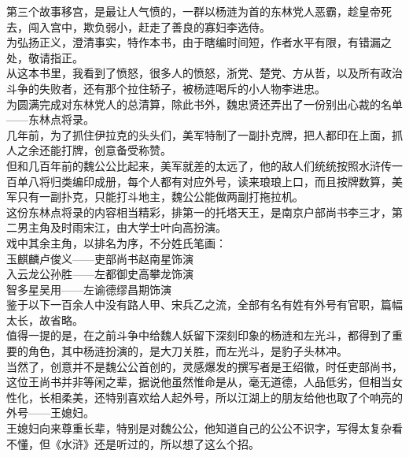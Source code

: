 \begin{multicols}{\theparacolNo}
第三个故事移宫，是最让人气愤的，一群以杨涟为首的东林党人恶霸，趁皇帝死去，闯入宫中，欺负弱小，赶走了善良的寡妇李选侍。\\

为弘扬正义，澄清事实，特作本书，由于瞎编时间短，作者水平有限，有错漏之处，敬请指正。\\

从这本书里，我看到了愤怒，很多人的愤怒，浙党、楚党、方从哲，以及所有政治斗争的失败者，还有那个拉住轿子，被杨涟喝斥的小人物李进忠。\\

为圆满完成对东林党人的总清算，除此书外，魏忠贤还弄出了一份别出心裁的名单——东林点将录。\\

几年前，为了抓住伊拉克的头头们，美军特制了一副扑克牌，把人都印在上面，抓人之余还能打牌，创意备受称赞。\\

但和几百年前的魏公公比起来，美军就差的太远了，他的敌人们统统按照水浒传一百单八将归类编印成册，每个人都有对应外号，读来琅琅上口，而且按牌数算，美军只有一副扑克，只能打斗地主，魏公公能做两副打拖拉机。\\

这份东林点将录的内容相当精彩，排第一的托塔天王，是南京户部尚书李三才，第二男主角及时雨宋江，由大学士叶向高扮演。\\

戏中其余主角，以排名为序，不分姓氏笔画：\\

玉麒麟卢俊义——吏部尚书赵南星饰演\\

入云龙公孙胜——左都御史高攀龙饰演\\

智多星吴用——左谕德缪昌期饰演\\

鉴于以下一百余人中没有路人甲、宋兵乙之流，全部有名有姓有外号有官职，篇幅太长，故省略。\\

值得一提的是，在之前斗争中给魏人妖留下深刻印象的杨涟和左光斗，都得到了重要的角色，其中杨涟扮演的，是大刀关胜，而左光斗，是豹子头林冲。\\

当然了，创意并不是魏公公首创的，灵感爆发的撰写者是王绍徽，时任吏部尚书，这位王尚书并非等闲之辈，据说他虽然惟命是从，毫无道德，人品低劣，但相当女性化，长相柔美，还特别喜欢给人起外号，所以江湖上的朋友给他也取了个响亮的外号——王媳妇。\\

王媳妇向来尊重长辈，特别是对魏公公，他知道自己的公公不识字，写得太复杂看不懂，但《水浒》还是听过的，所以想了这么个招。\\


\end{multicols}
